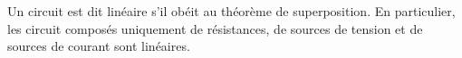 \documentclass[a4paper]{article}
\begin{document}
\pagestyle{fancy}
\fancyhf{}
\setlength{\headheight}{15pt}

\begin{center}
	\large{}
\end{center}


Un circuit est dit linéaire s'il obéit au théorème de superposition. En particulier, les circuit composés uniquement de résistances, de sources de tension et de sources de courant sont linéaires.
\end{document}
